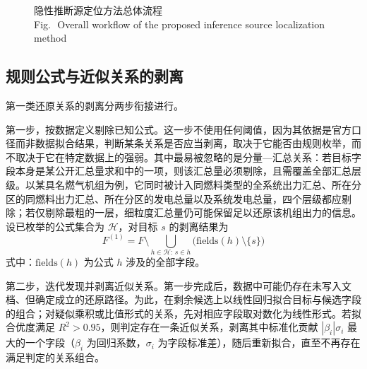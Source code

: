 \documentclass[UTF8,zihao=5,twoside]{ctexart}
\newcommand{\figbicaption}[2]{\caption{#1\\[-0.2em]\small Fig.\,\thefigure\ #2}}
\begin{document}
\begin{figure}[!tbp]
\centering
{}
\figbicaption{隐性推断源定位方法总体流程}{Overall workflow of the proposed inference source localization method}
\label{fig:flow}
\end{figure}

\subsection{规则公式与近似关系的剥离}

第一类还原关系的剥离分两步衔接进行。

第一步，按数据定义剔除已知公式。这一步不使用任何阈值，因为其依据是官方口径而非数据拟合结果，判断某条关系是否应当剥离，取决于它能否由规则枚举，而不取决于它在特定数据上的强弱。其中最易被忽略的是分量—汇总关系：若目标字段本身是某公开汇总量求和中的一项，则该汇总量必须剔除，且需覆盖全部汇总层级。以某具名燃气机组为例，它同时被计入同燃料类型的全系统出力汇总、所在分区的同燃料出力汇总、所在分区的发电总量以及系统发电总量，四个层级都应剔除；若仅剔除最粗的一层，细粒度汇总量仍可能保留足以还原该机组出力的信息。设已枚举的公式集合为 $\mathcal{H}$，对目标 $s$ 的剥离结果为
\begin{equation}
F^{(1)}=F\setminus\bigcup_{h\in\mathcal{H}:\,s\in h}\big(\mathrm{fields}(h)\setminus\{s\}\big)
\end{equation}
式中：$\mathrm{fields}(h)$ 为公式 $h$ 涉及的全部字段。

第二步，迭代发现并剥离近似关系。第一步完成后，数据中可能仍存在未写入文档、但确定成立的还原路径。为此，在剩余候选上以线性回归拟合目标与候选字段的组合；对疑似乘积或比值形式的关系，先对相应字段取对数化为线性形式。若拟合优度满足 $R^2>0.95$，则判定存在一条近似关系，剥离其中标准化贡献 $|\beta_i|\sigma_i$ 最大的一个字段（$\beta_i$ 为回归系数，$\sigma_i$ 为字段标准差），随后重新拟合，直至不再存在满足判定的关系组合。
\end{document}
